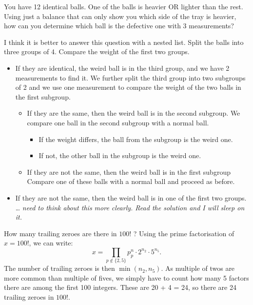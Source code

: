 \begin{qanda} %
    \Q 
    You have 12 identical balls.
    One of the balls is heavier OR lighter than the rest. 
    Using just a balance that can only show you which side of the tray is heavier, how can you determine which ball is the defective one with 3 measurements?

    \A
    I think it is better to answer this question with a nested list.
    Split the balls into three groups of 4.
    Compare the weight of the first two groups.
    \begin{itemize}
        \item If they are identical, the weird ball is in the third group, and we have 2 measurements to find it. We further split the third group into two subgroups of 2 and we use one measurement to compare the weight of the two balls in the first subgroup. 
        \begin{itemize}
            \item If they are the same, then the weird ball is in the second subgroup. We compare one ball in the second subgroup with a normal ball. 
            \begin{itemize}
                \item If the weight differs, the ball from the subgroup is the weird one.
                \item If not, the other ball in the subgroup is the weird one.
            \end{itemize} 
            \item If they are not the same, then the weird ball is in the first subgroup 
                Compare one of these balls with a normal ball and proceed as before.
        \end{itemize} 
        \item If they are not the same, then the weird ball is in one of the first two groups. 
            \ldots
            \emph{need to think about this more clearly. Read the solution and I will sleep on it.}
    \end{itemize}
\end{qanda}

\begin{qanda} %
    \Q How many trailing zeroes are there in $100!$ ?
    \A Using the prime factorisation of $x=100!$, we can write: 
    $$x = \prod_{p \notin \{2,5\}} p^n_p \cdot 2^{n_2} \cdot 5^{n_5}.$$
    The number of trailing zeroes is then $\min(n_2, n_5)$. As multiple of twos are more common than multiple of fives, we simply have to count how many 5 factors there are among the first 100 integers.
    These are 20 + 4 = 24, so there are 24 trailing zeroes in $100!$.
\end{qanda}

